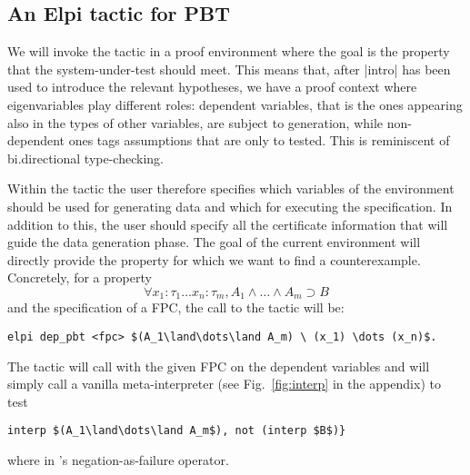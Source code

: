 \subsection{An Elpi tactic for PBT}
We will invoke the tactic in a
proof environment  where the goal is %
the property that the system-under-test should meet. This means that, after
\lsti|intro| has been used to introduce the relevant hypotheses, we
 have a proof context %
where eigenvariables  play different roles:  dependent
variables, that is the ones appearing also in the types of other variables, are subject to generation, while
non-dependent ones tags assumptions that are only to tested. This is reminiscent of bi.directional type-checking. %

Within the tactic the user therefore
specifies which variables of the environment should be used for
generating data and which for executing the specification. In addition
to this, the user should specify all the certificate information that
will guide the data generation phase. The goal of the current
environment will directly provide the property for which we want to
find a counterexample. %
Concretely, for a property
\[
\forall x_1 \colon \tau_1\dots x_n \colon \tau_m, A_1\land\dots\land A_m \supset B
\]
and the specification of a FPC, the call to the tactic will be:
\begin{lstlisting}
elpi dep_pbt <fpc> $(A_1\land\dots\land A_m) \ (x_1) \dots (x_n)$.
\end{lstlisting}
The tactic will call  with the given FPC on the dependent variables and will simply call a vanilla meta-interpreter (see Fig.~\ref{fig:interp} in the appendix) to test
\begin{lstlisting}
interp $(A_1\land\dots\land A_m$), not (interp $B$)}
\end{lstlisting}
where  in \lP's negation-as-failure operator.

